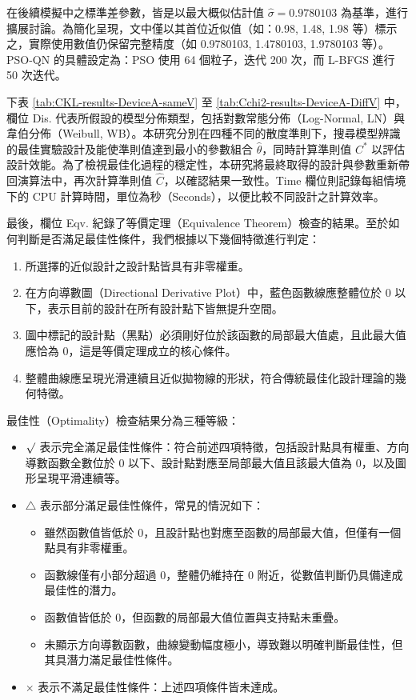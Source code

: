 \hspace*{8mm} 在後續模擬中之標準差參數，皆是以最大概似估計值 $\hat{\sigma} = 0.9780103$ 為基準，進行擴展討論。為簡化呈現，文中僅以其首位近似值（如：0.98, 1.48, 1.98 等）標示之，實際使用數值仍保留完整精度（如 0.9780103, 1.4780103, 1.9780103 等）。PSO-QN 的具體設定為：PSO 使用 64 個粒子，迭代 200 次，而 L-BFGS 進行 50 次迭代。

\hspace*{8mm} 下表 \ref{tab:CKL-results-DeviceA-sameV} 至 \ref{tab:Cchi2-results-DeviceA-DiffV} 中，欄位 Dis. 代表所假設的模型分佈類型，包括對數常態分佈（Log-Normal, LN）與韋伯分佈（Weibull, WB）。本研究分別在四種不同的散度準則下，搜尋模型辨識的最佳實驗設計及能使準則值達到最小的參數組合 $\hat{\theta}$，同時計算準則值 $C^*$ 以評估設計效能。為了檢視最佳化過程的穩定性，本研究將最終取得的設計與參數重新帶回演算法中，再次計算準則值 $\hat{C}$，以確認結果一致性。Time 欄位則記錄每組情境下的 CPU 計算時間，單位為秒（Seconds），以便比較不同設計之計算效率。

\hspace*{8mm} 最後，欄位 Eqv. 紀錄了等價定理（Equivalence Theorem）檢查的結果。至於如何判斷是否滿足最佳性條件，我們根據以下幾個特徵進行判定：

\begin{enumerate} 
\item 所選擇的近似設計之設計點皆具有非零權重。 
\item 在方向導數圖（Directional Derivative Plot）中，藍色函數線應整體位於 0 以下，表示目前的設計在所有設計點下皆無提升空間。
\item 圖中標記的設計點（黑點）必須剛好位於該函數的局部最大值處，且此最大值應恰為 0，這是等價定理成立的核心條件。
\item 整體曲線應呈現光滑連續且近似拋物線的形狀，符合傳統最佳化設計理論的幾何特徵。
\end{enumerate}

最佳性（Optimality）檢查結果分為三種等級：

\begin{itemize}
\item $\surd$ 表示完全滿足最佳性條件：符合前述四項特徵，包括設計點具有權重、方向導數函數全數位於 0 以下、設計點對應至局部最大值且該最大值為 0，以及圖形呈現平滑連續等。

\item $\triangle$ 表示部分滿足最佳性條件，常見的情況如下：

\begin{itemize} 
\item 雖然函數值皆低於 0，且設計點也對應至函數的局部最大值，但僅有一個點具有非零權重。
\item 函數線僅有小部分超過 0，整體仍維持在 0 附近，從數值判斷仍具備達成最佳性的潛力。
\item 函數值皆低於 0，但函數的局部最大值位置與支持點未重疊。
\item 未顯示方向導數函數，曲線變動幅度極小，導致難以明確判斷最佳性，但其具潛力滿足最佳性條件。
\end{itemize}

\item $\times$ 表示不滿足最佳性條件：上述四項條件皆未達成。 
\end{itemize}

